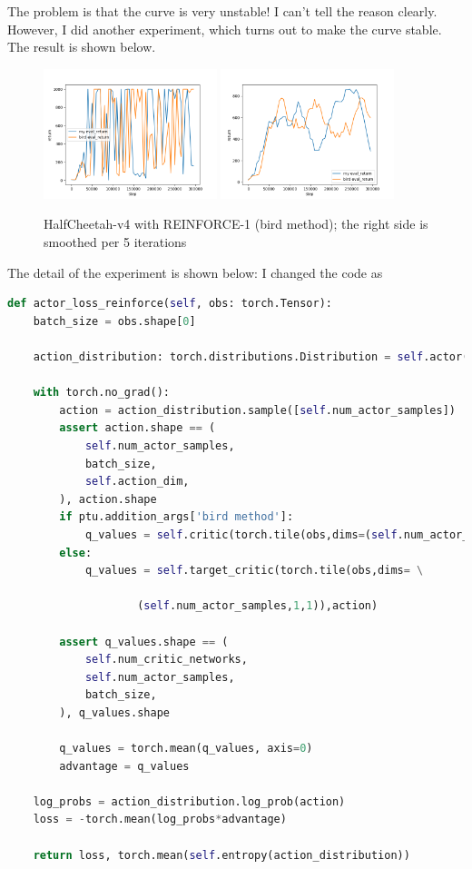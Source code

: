 The problem is that the curve is very unstable! I can't tell the reason clearly. However, I did another experiment, which turns out to make the curve stable. The result is shown below.

\begin{figure}[H]
    \centering
    \includegraphics[width=0.45\textwidth]{../report/assets/P3-1-3-1-compare.png}
    \includegraphics[width=0.45\textwidth]{../report/assets/P3-1-3-1-compare-smoothed.png}
    \caption{HalfCheetah-v4 with REINFORCE-1 (bird method); the right side is smoothed per 5 iterations}
    \label{fig:halfcheetah-v4-reinforce-1-another}
\end{figure}

The detail of the experiment is shown below: I changed the code as 
\begin{lstlisting}[language=Python]
def actor_loss_reinforce(self, obs: torch.Tensor):
    batch_size = obs.shape[0]

    action_distribution: torch.distributions.Distribution = self.actor(obs)

    with torch.no_grad():
        action = action_distribution.sample([self.num_actor_samples])
        assert action.shape == (
            self.num_actor_samples,
            batch_size,
            self.action_dim,
        ), action.shape
        if ptu.addition_args['bird method']:
            q_values = self.critic(torch.tile(obs,dims=(self.num_actor_samples,1,1)),action)
        else:
            q_values = self.target_critic(torch.tile(obs,dims= \
            
                    (self.num_actor_samples,1,1)),action)

        assert q_values.shape == (
            self.num_critic_networks,
            self.num_actor_samples,
            batch_size,
        ), q_values.shape

        q_values = torch.mean(q_values, axis=0)
        advantage = q_values

    log_probs = action_distribution.log_prob(action)
    loss = -torch.mean(log_probs*advantage)

    return loss, torch.mean(self.entropy(action_distribution))

\end{lstlisting}

